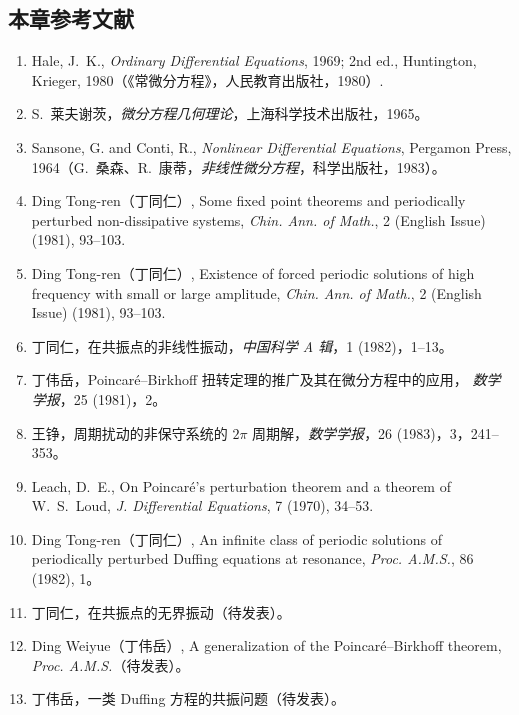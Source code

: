 \subsection*{本章参考文献}
\begin{enumerate}
  \item Hale, J.~K., \textit{Ordinary Differential Equations}, 1969; 2nd ed.,
  Huntington, Krieger, 1980（《常微分方程》，人民教育出版社，1980）.
  \item S.~莱夫谢茨，\textit{微分方程几何理论}，上海科学技术出版社，1965。
  \item Sansone, G. and Conti, R., \textit{Nonlinear Differential Equations},
  Pergamon Press, 1964（G.~桑森、R.~康蒂，\textit{非线性微分方程}，科学出版社，1983）。
  \item Ding Tong-ren（丁同仁）, Some fixed point theorems and periodically perturbed
  non-dissipative systems, \textit{Chin. Ann. of Math.}, 2 (English Issue) (1981), 93--103.
  \item Ding Tong-ren（丁同仁）, Existence of forced periodic solutions of high frequency
  with small or large amplitude, \textit{Chin. Ann. of Math.}, 2 (English Issue) (1981), 93--103.
  \item 丁同仁，在共振点的非线性振动，\textit{中国科学 A 辑}，1 (1982)，1--13。
  \item 丁伟岳，Poincar\'e--Birkhoff 扭转定理的推广及其在微分方程中的应用，
  \textit{数学学报}，25 (1981)，2。
  \item 王铮，周期扰动的非保守系统的 $2\pi$ 周期解，\textit{数学学报}，26 (1983)，3，241--353。
  \item Leach, D.~E., On Poincar\'e's perturbation theorem and a theorem of W.~S.~Loud,
  \textit{J. Differential Equations}, 7 (1970), 34--53.
  \item Ding Tong-ren（丁同仁）, An infinite class of periodic solutions of periodically
  perturbed Duffing equations at resonance, \textit{Proc. A.M.S.}, 86 (1982), 1。
  \item 丁同仁，在共振点的无界振动（待发表）。
  \item Ding Weiyue（丁伟岳）, A generalization of the Poincar\'e--Birkhoff theorem,
  \textit{Proc. A.M.S.}（待发表）。
  \item 丁伟岳，一类 Duffing 方程的共振问题（待发表）。
\end{enumerate}

\endinput
